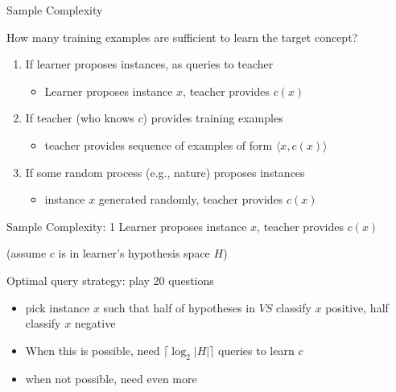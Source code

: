 \documentclass[%
pdf,
colorBG,
slideColor,
tcrico,
]{prosper}
\begin{document}
\begin{slide}{Sample Complexity }
\tiny 

How many training examples are sufficient to learn the target concept?

\begin{enumerate}
\item
If learner proposes instances, as queries to teacher
\begin{itemize}
\item Learner proposes instance $x$, teacher provides $c(x)$
\end{itemize}

\item
If teacher (who knows $c$) provides training examples
\begin{itemize}
\item teacher provides sequence of examples of form $\langle x, c(x) \rangle$
\end{itemize}

\item
If some random process (e.g., nature) proposes instances
\begin{itemize}
\item instance $x$ generated randomly, teacher provides $c(x)$
\end{itemize}
\end{enumerate}
\end{slide}


\begin{slide}{Sample Complexity: 1 }
\tiny 
Learner proposes instance $x$, teacher provides $c(x)$

(assume $c$ is in learner's hypothesis space $H$)


Optimal query strategy: play 20 questions
\begin{itemize} \item pick instance $x$ such that half of hypotheses in $VS$ classify $x$
positive, half classify $x$ negative
\item When this is possible, need $\lceil \log_2 |H| \rceil  $ queries to learn $c$
\item when not possible, need even more
\end{itemize}
\end{slide}

\end{document}
